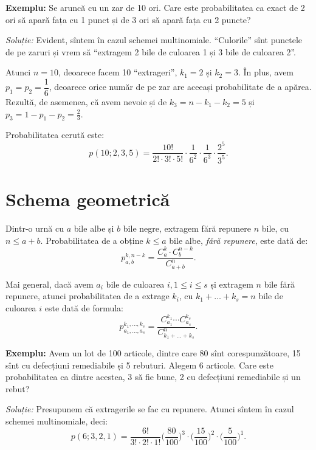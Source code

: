 \documentclass[12pt,a4paper]{article}
\newcommand\qq{\enquote}
\theoremstyle{dotless}
\theoremstyle{dotlessdr}
\begin{document}
\vspace{1cm}

\textbf{Exemplu:} Se aruncă cu un zar de 10 ori. Care este probabilitatea
ca exact de 2 ori să apară fața cu 1 punct și de 3 ori să apară fața cu 2 puncte?

\emph{Soluție:} Evident, sîntem în cazul schemei multinomiale. \qq{Culorile}
sînt punctele de pe zaruri și vrem să \qq{extragem 2 bile de culoarea 1 și 3
  bile de culoarea 2}.

Atunci $ n = 10 $, deoarece facem 10 \qq{extrageri}, $ k_1 = 2 $ și $ k_2 = 3 $.
În plus, avem $ p_1 = p_2 = \dfrac{1}{6} $, deoarece orice număr de pe zar are
aceeași probabilitate de a apărea. Rezultă, de asemenea, că avem nevoie și
de $ k_3 = n - k_1 - k_2 = 5 $ și $ p_3 = 1 - p_1 - p_2 = \frac{2}{3} $.

Probabilitatea cerută este:
\[
  p(10; 2, 3, 5) = \frac{10!}{2! \cdot 3! \cdot 5!} \cdot %
  \frac{1}{6^2} \cdot \frac{1}{6^3} \cdot \frac{2^5}{3^5}.
\]


\section*{Schema geometrică}

\indent\indent Dintr-o urnă cu $ a $ bile albe și $ b $ bile negre, extragem
fără repunere $ n $ bile, cu $ n \leq a + b $. Probabilitatea de a obține
$ k \leq a $ bile albe, \emph{fără repunere}, este dată de:
\[
  p_{a, b}^{k, n - k} = \frac{C_a^k \cdot C_b^{n-k}}{C_{a+b}^n}.
\]

Mai general, dacă avem $ a_i $ bile de culoarea $ i, 1 \leq i \leq s $ și
extragem $ n $ bile fără repunere, atunci probabilitatea de a extrage $ k_i $,
cu $ k_1 + \dots + k_s = n $ bile de culoarea $ i $ este dată de formula:
\[
  p_{a_1, \dots, a_s}^{k_1, \dots, k_s} = %
  \frac{C_{a_1}^{k_1} \cdots C_{a_s}^{k_s}}{C_{k_1 + \dots + k_s}^n}.
\]

\vspace{1cm}

\textbf{Exemplu:} Avem un lot de 100 articole, dintre care 80 sînt corespunzătoare,
15 sînt cu defecțiuni remediabile și 5 rebuturi. Alegem 6 articole. Care este
probabilitatea ca dintre acestea, 3 să fie bune, 2 cu defecțiuni remediabile și
un rebut?

\emph{Soluție:} Presupunem că extragerile se fac cu repunere. Atunci sîntem în cazul
schemei multinomiale, deci:
\[
  p(6; 3, 2, 1) = \frac{6!}{3! \cdot 2! \cdot 1!} \Big(\frac{80}{100}\Big)^3 \cdot %
  \Big( \frac{15}{100} \Big)^2 \cdot \Big( \frac{5}{100} \Big)^1.
\]
\end{document}
